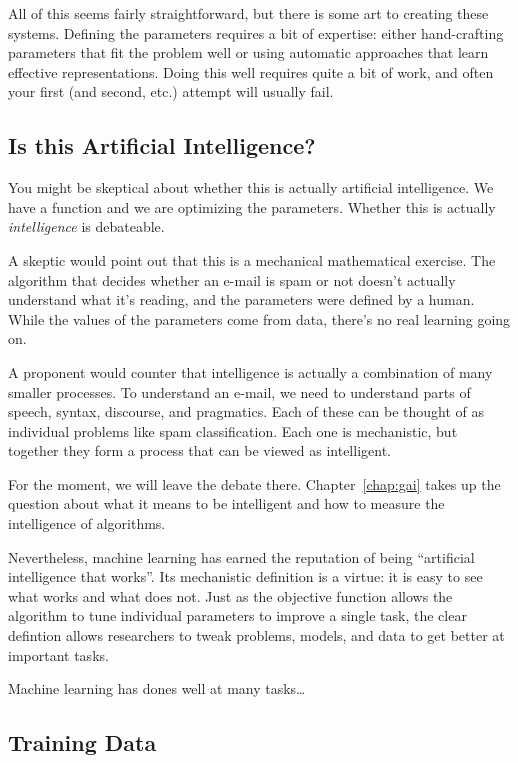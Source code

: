 All of this seems fairly straightforward, but there is some art to
creating these systems.  Defining the parameters requires a bit of
expertise: either hand-crafting parameters that fit the problem well
or using automatic approaches that learn effective representations.
Doing this well requires quite a bit of work, and often your first
(and second, etc.) attempt will usually fail.

\subsection{Is this Artificial Intelligence?}

You might be skeptical about whether this is actually artificial
intelligence.  We have a function and we are optimizing the
parameters.  Whether this is actually \emph{intelligence} is
debateable.

A skeptic would point out that this is a mechanical mathematical
exercise.  The algorithm that decides whether an e-mail is spam or not
doesn't actually understand what it's reading, and the parameters were
defined by a human.  While the values of the parameters come from
data, there's no real learning going on.

A proponent would counter that intelligence is actually a combination
of many smaller processes.  To understand an e-mail, we need to
understand parts of speech, syntax, discourse, and pragmatics.  Each
of these can be thought of as individual problems like spam
classification.  Each one is mechanistic, but together they form a
process that can be viewed as intelligent.

For the moment, we will leave the debate there.
Chapter~\ref{chap:gai} takes up the question about what it means to be
intelligent and how to measure the intelligence of algorithms.

Nevertheless, machine learning has earned the reputation of being
``artificial intelligence that works''.  Its mechanistic definition is
a virtue: it is easy to see what works and what does not.  Just as the
objective function allows the algorithm to tune individual parameters
to improve a single task, the clear defintion allows researchers to
tweak problems, models, and data to get better at important tasks.

Machine learning has dones well at many tasks\dots

\subsection{Training Data}


